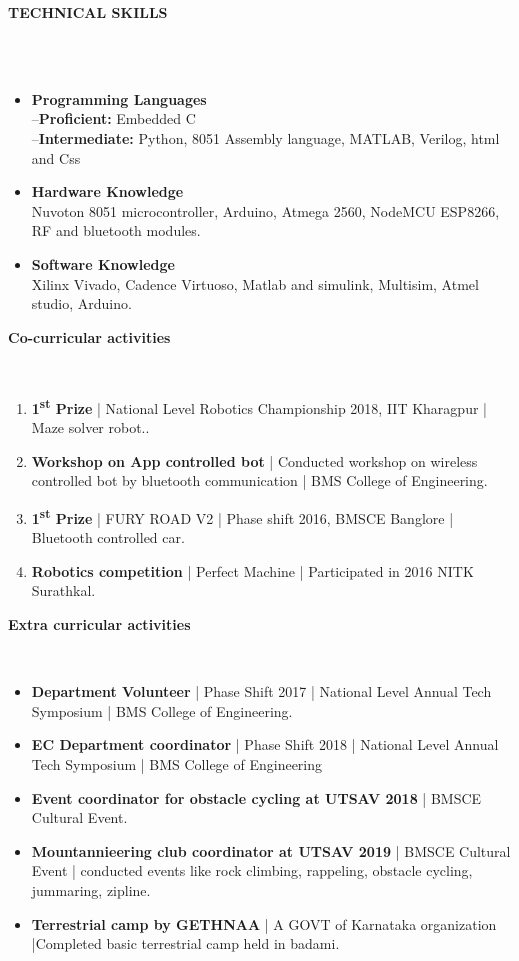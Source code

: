 \documentclass[a4paper,10pt]{article}
\newcommand{\lsep}{-0.5cm}
\newcommand{\resheading}[1]{{\small \colorbox{mygrey}{\begin{minipage}{0.975\textwidth}{\textbf{#1 \vphantom{p\^{E}}}}\end{minipage}}}}
\begin{document}
\resheading{\textbf{TECHNICAL SKILLS} }\\\\[\lsep]
\begin{itemize}
\item \noindent \textbf{Programming Languages}\\
     --\textbf{Proficient:} Embedded C\\
     --\textbf{Intermediate:} Python, 8051 Assembly language, MATLAB, Verilog, html and Css\\
\item\noindent\textbf{Hardware Knowledge}\\
Nuvoton 8051 microcontroller, Arduino, Atmega 2560, NodeMCU ESP8266, RF and bluetooth modules.\\
\item\noindent\textbf{Software Knowledge}\\
Xilinx Vivado, Cadence Virtuoso, Matlab and simulink, Multisim, Atmel studio, Arduino.
\end{itemize}

\resheading{\textbf{Co-curricular activities} }\\[\lsep]
\begin{enumerate}
\item\noindent \textbf{1\textsuperscript{st} Prize} | National Level Robotics Championship 2018, IIT Kharagpur | Maze solver robot..   
\item\noindent \textbf{Workshop on App controlled bot} | Conducted workshop on wireless controlled bot by bluetooth communication | BMS College of Engineering.
\item\noindent\textbf{1\textsuperscript{st} Prize} | FURY ROAD V2 | Phase shift 2016, BMSCE Banglore | Bluetooth controlled car. 
\item\noindent\textbf{Robotics competition} | Perfect Machine | Participated in 2016 NITK Surathkal.

\end{enumerate}

\resheading{\textbf{Extra curricular activities} }\\[\lsep]
\begin{itemize}
\item \noindent \textbf{Department Volunteer} | Phase Shift 2017 | National Level Annual Tech Symposium | BMS College of Engineering.
\item \noindent \textbf{ EC Department coordinator} | Phase Shift 2018 | National Level Annual Tech Symposium | BMS College of Engineering
\item \noindent \textbf{Event coordinator for obstacle cycling at UTSAV 2018} | BMSCE Cultural Event.
\item \noindent \textbf{Mountannieering club coordinator at UTSAV 2019} | BMSCE Cultural Event | conducted events like rock climbing, rappeling,  obstacle cycling, jummaring, zipline.
\item \noindent \textbf{Terrestrial camp by GETHNAA } | A GOVT of Karnataka organization |Completed basic terrestrial camp held in badami.

\end{itemize}
\end{document}
